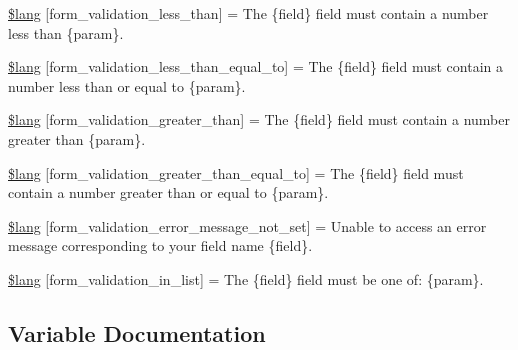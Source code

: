 \begin{DoxyCompactItemize}
\mbox{\hyperlink{form__validation__lang_8php_add53307a4c323f98f2f49db07fb2a0cc}{\$lang}} \mbox{[}\textquotesingle{}form\+\_\+validation\+\_\+less\+\_\+than\textquotesingle{}\mbox{]} = \textquotesingle{}The \{field\} field must contain a number less than \{param\}.\textquotesingle{}
\item 
\mbox{\hyperlink{form__validation__lang_8php_ab217eb2b726c0f710b26bb7ab6421120}{\$lang}} \mbox{[}\textquotesingle{}form\+\_\+validation\+\_\+less\+\_\+than\+\_\+equal\+\_\+to\textquotesingle{}\mbox{]} = \textquotesingle{}The \{field\} field must contain a number less than or equal to \{param\}.\textquotesingle{}
\item 
\mbox{\hyperlink{form__validation__lang_8php_ad8b21ec5b6a2e772d9e3db7552c18b7a}{\$lang}} \mbox{[}\textquotesingle{}form\+\_\+validation\+\_\+greater\+\_\+than\textquotesingle{}\mbox{]} = \textquotesingle{}The \{field\} field must contain a number greater than \{param\}.\textquotesingle{}
\item 
\mbox{\hyperlink{form__validation__lang_8php_ac56bb6c60fdddd2eef2c2efce06cd837}{\$lang}} \mbox{[}\textquotesingle{}form\+\_\+validation\+\_\+greater\+\_\+than\+\_\+equal\+\_\+to\textquotesingle{}\mbox{]} = \textquotesingle{}The \{field\} field must contain a number greater than or equal to \{param\}.\textquotesingle{}
\item 
\mbox{\hyperlink{form__validation__lang_8php_af96792d4315dbf49e8fce7b425f1ca2a}{\$lang}} \mbox{[}\textquotesingle{}form\+\_\+validation\+\_\+error\+\_\+message\+\_\+not\+\_\+set\textquotesingle{}\mbox{]} = \textquotesingle{}Unable to access an error message corresponding to your field name \{field\}.\textquotesingle{}
\item 
\mbox{\hyperlink{form__validation__lang_8php_a098ac5ae1613c79abbc167198f9a5eec}{\$lang}} \mbox{[}\textquotesingle{}form\+\_\+validation\+\_\+in\+\_\+list\textquotesingle{}\mbox{]} = \textquotesingle{}The \{field\} field must be one of\+: \{param\}.\textquotesingle{}
\end{DoxyCompactItemize}


\subsection{Variable Documentation}
\mbox{\label{form__validation__lang_8php_a7c6b74d48acd188829365b6db579aa56}} 
